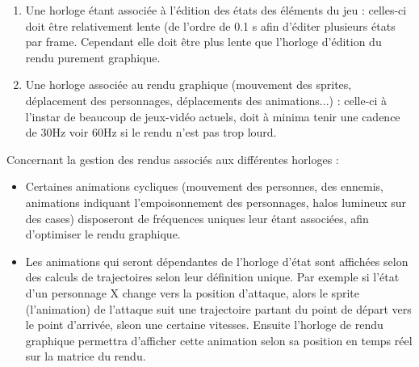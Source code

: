 \documentclass[a4paper,12pt]{article}
\begin{document}
\begin{enumerate}
    \item Une horloge étant associée à l'édition des états des éléments du jeu : celles-ci doit être relativement lente (de l'ordre de 0.1 s afin d'éditer plusieurs états par frame. Cependant elle doit être plus lente que l'horloge d'édition du rendu purement graphique.
    \item Une horloge associée au rendu graphique (mouvement des sprites, déplacement des personnages, déplacements des animations...) : celle-ci à l'instar de beaucoup de jeux-vidéo actuels, doit à minima tenir une cadence de 30Hz voir 60Hz si le rendu n'est pas trop lourd. 
\end{enumerate}
Concernant la gestion des rendus associés aux différentes horloges :
\begin{itemize}

    \item Certaines animations cycliques (mouvement des personnes, des ennemis, animations indiquant l'empoisonnement des personnages, halos lumineux sur des cases) disposeront de fréquences uniques leur étant associées, afin d'optimiser le rendu graphique.
    \item Les animations qui seront dépendantes de l'horloge d'état sont affichées selon des calculs de trajectoires selon leur définition unique. Par exemple si l'état d'un personnage X change vers la position d'attaque, alors le sprite (l'animation) de l'attaque suit une trajectoire partant du point de départ vers le point d'arrivée, sleon une certaine vitesses. Ensuite l'horloge de rendu graphique permettra d'afficher cette animation selon sa position en temps réel sur la matrice du rendu. 
\end{itemize}
\end{document}
